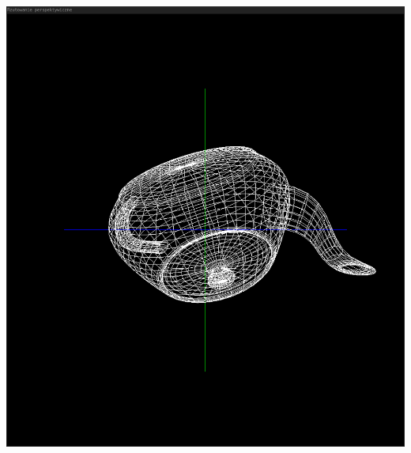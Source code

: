 \documentclass[polish,polish,a4paper]{report}
\begin{document}
\begin{center}
\includegraphics[width=\textwidth=2]{imbryk4}
\end{center}
\end{document}
